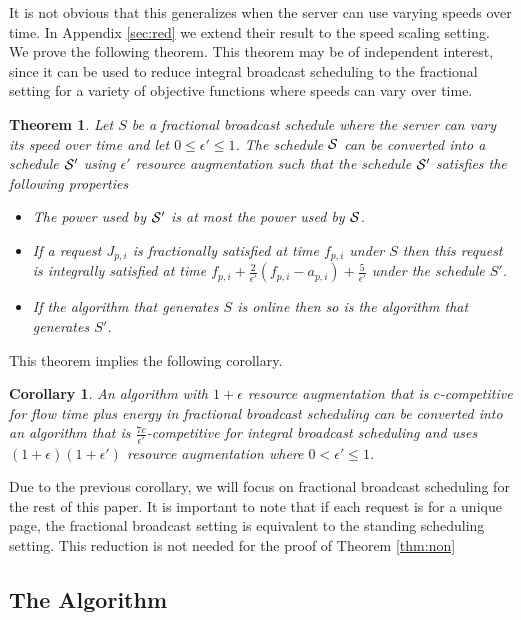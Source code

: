 \documentclass[11pt]{article}
\newtheorem{theorem}[lemma]{Theorem}
\newtheorem{corollary}[lemma]{Corollary}
\newcommand{\eps}{\epsilon}
\newcommand{\cS}{{\cal S}}
\begin{document}
It is not obvious that this generalizes when the server can use varying speeds over time. In Appendix \ref{sec:red} we extend their result to the speed scaling setting. We prove the following theorem.  This theorem may be of independent interest, since it can be used to reduce integral broadcast scheduling to the fractional setting for a variety of objective functions where speeds can vary over time. 

\begin{theorem}
\label{thm:red}
Let $S$ be a fractional broadcast schedule where the server can vary its speed over time and let $0 \leq \eps' \leq 1$.  The schedule $\cS$ can be converted into a schedule $\cS'$ using $\eps'$ resource augmentation such that the schedule $\cS'$ satisfies the following properties
\begin{itemize}
\item The power used by $\cS'$ is at most the power used by $\cS$.
\item If a request $J_{p,i}$ is fractionally satisfied at time $f_{p,i}$ under $S$ then this request is integrally satisfied at time $f_{p,i} + \frac{2}{\eps'}(f_{p,i} - a_{p,i}) + \frac{5}{\eps'}$ under the schedule $S'$.
\item If the algorithm that generates $S$ is online then so is the algorithm that generates $S'$.
\end{itemize}

\end{theorem}

This theorem implies the following corollary.
\begin{corollary} \label{cor}
An algorithm with $1+\eps$ resource augmentation that is $c$-competitive for flow time plus energy in fractional broadcast scheduling can be converted into an algorithm that is $\frac{7c}{\eps'}$-competitive for integral broadcast scheduling and uses $(1+\eps)(1+\eps')$ resource augmentation where $0 < \eps' \leq 1$.  
\end{corollary}

Due to the previous corollary, we will focus on fractional broadcast scheduling for the rest of this paper.  It is important to note that if each request is for a unique page, the fractional broadcast setting is equivalent to the standing scheduling setting. This reduction is not needed for the proof of Theorem \ref{thm:non}

\subsection{The Algorithm}
\end{document}
